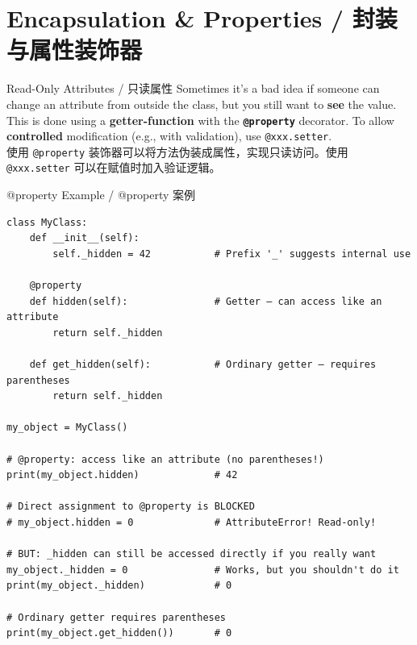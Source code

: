 \documentclass[11pt,a4paper]{report}
\let\oldtexttt\texttt
\renewcommand{\texttt}[1]{\textcolor{mainblue}{\oldtexttt{#1}}}
\begin{document}
\section{Encapsulation \& Properties / 封装与属性装饰器}

\begin{concept}{Read-Only Attributes / 只读属性}
    Sometimes it's a bad idea if someone can change an attribute from outside the class, but you still want to \textbf{see} the value. This is done using a \textbf{getter-function} with the \textbf{\texttt{@property}} decorator. To allow \textbf{controlled} modification (e.g., with validation), use \texttt{@xxx.setter}. \\
    使用 \texttt{@property} 装饰器可以将方法伪装成属性，实现只读访问。使用 \texttt{@xxx.setter} 可以在赋值时加入验证逻辑。
\end{concept}

\begin{examplebox}{@property Example / @property 案例}
\begin{lstlisting}
class MyClass:
    def __init__(self):
        self._hidden = 42           # Prefix '_' suggests internal use

    @property
    def hidden(self):               # Getter — can access like an attribute
        return self._hidden

    def get_hidden(self):           # Ordinary getter — requires parentheses
        return self._hidden

my_object = MyClass()

# @property: access like an attribute (no parentheses!)
print(my_object.hidden)             # 42

# Direct assignment to @property is BLOCKED
# my_object.hidden = 0              # AttributeError! Read-only!

# BUT: _hidden can still be accessed directly if you really want
my_object._hidden = 0               # Works, but you shouldn't do it
print(my_object._hidden)            # 0

# Ordinary getter requires parentheses
print(my_object.get_hidden())       # 0
\end{lstlisting}
\end{examplebox}
\end{document}
